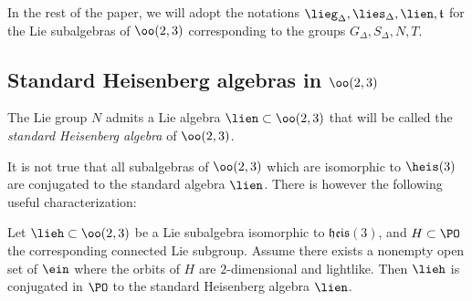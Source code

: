 In the rest of the paper, we will adopt the notations $\lieg_{\Delta}, \lies_{\Delta}, \lien, \mathfrak{t}$ for the Lie subalgebras of $\oo(2,3)$ corresponding to the groups $G_{\Delta}, S_{\Delta}, N, T$.


\subsection{Standard Heisenberg algebras in \texorpdfstring{$\oo(2,3)$}{oo(2,3)}}\label{sec.standard}

The Lie group $N$ admits a Lie algebra $\lien \subset \oo(2,3)$ that will be called the \emph{standard Heisenberg algebra} of $\oo(2,3)$.

It is not true that all subalgebras of $\oo(2,3)$ which are isomorphic to $\heis(3)$ are conjugated to the standard algebra $\lien$. There is however the following useful characterization:

\begin{lemm}\label{lem.standard}
Let $\lieh \subset \oo(2,3)$ be a Lie subalgebra isomorphic to $\mathfrak{heis}(3)$, and $H \subset \PO$ the corresponding connected Lie subgroup. Assume there exists a nonempty open set of $\ein$ where the orbits of $H$ are $2$-dimensional and lightlike. Then $\lieh$ is conjugated in $\PO$ to the standard Heisenberg algebra $\lien$.
\end{lemm}


